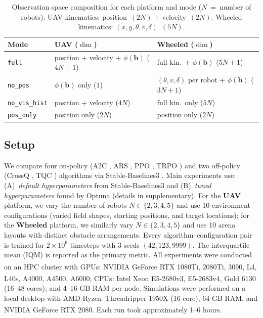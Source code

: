\documentclass{article}
\begin{document}
\begin{table}[h]
\centering
\footnotesize
\caption{\small Observation space composition for each platform and mode ($N$~=~number of robots). UAV kinematics: position~$(2N)$ + velocity~$(2N)$. Wheeled kinematics: $(x,y,\theta,v,\delta)$~$(5N)$.}
\label{tab:obs_modes}
\begin{tabular}{l|ll}
    \toprule
    \textbf{Mode} & \textbf{UAV ($\dim$)} & \textbf{Wheeled ($\dim$)} \\
    \midrule
    \texttt{full}        & position + velocity + $\phi(\mathbf{b})$ ($4N+1$) & full kin.\ + $\phi(\mathbf{b})$ ($5N+1$) \\
    \texttt{no\_pos}     & $\phi(\mathbf{b})$ only ($1$) & $(\theta,v,\delta)$ per robot + $\phi(\mathbf{b})$ ($3N+1$) \\
    \texttt{no\_vis\_hist} & position + velocity ($4N$) & full kin.\ only ($5N$) \\
    \texttt{pos\_only}   & position only ($2N$) & position only ($2N$) \\
    \bottomrule
\end{tabular}
\end{table}

\subsection{Setup}
\label{sec:exp:setup}

We compare four on-policy (A2C \citep{mnih2016a2c}, ARS \citep{mania2018ars}, PPO \citep{schulman2017ppo}, TRPO \citep{schulman2015trust}) and two off-policy (CrossQ \citep{bhatt2024crossq}, TQC \citep{kuznetsov2020tqc}) algorithms via Stable-Baselines3 \citep{stable-baselines3}. Main experiments use: (A)~\textit{default hyperparameters} from Stable-Baselines3 and (B)~\textit{tuned hyperparameters} found by Optuna \citep{optuna_2019} (details in supplementary). For the \textbf{UAV} platform, we vary the number of robots $N \in \{2, 3, 4, 5\}$ and use 10 environment configurations (varied field shapes, starting positions, and target locations); for the \textbf{Wheeled} platform, we similarly vary $N \in \{2, 3, 4, 5\}$ and use 10 arena layouts with distinct obstacle arrangements. Every algorithm--configuration pair is trained for $2 \times 10^6$ timesteps with 3 seeds $(42, 123, 9999)$. The interquartile mean (IQM) \citep{agarwal2021deep} is reported as the primary metric. All experiments were conducted on an HPC cluster with GPUs: NVIDIA\textsuperscript{\textregistered} GeForce RTX 1080Ti, 2080Ti, 3090, L4, L40s, A4000, A4500, A6000; CPUs: Intel\textsuperscript{\textregistered} Xeon\textsuperscript{\textregistered} E5-2680v3, E5-2683v4, Gold 6130 (16--48 cores); and 4--16 GB RAM per node. Simulations were performed on a local desktop with AMD Ryzen\texttrademark\ Threadripper 1950X (16-core), 64 GB RAM, and NVIDIA\textsuperscript{\textregistered} GeForce RTX 2080. Each run took approximately 1--6 hours.
\end{document}
